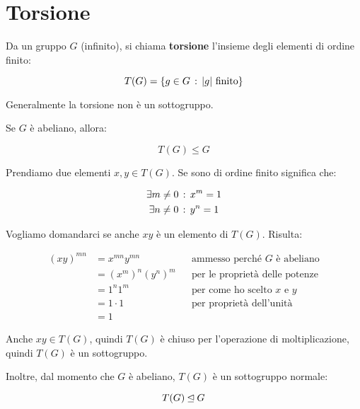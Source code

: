 \chapter{Torsione}

Da un gruppo $G$ (infinito), si chiama \textbf{torsione} l'insieme degli elementi di ordine finito:

\begin{equation}
	T(G) = \{g \in G \,:\, \lvert g \rvert \text{ finito}\}
\end{equation}

Generalmente la torsione non è un sottogruppo.

\begin{esercizio}
	Se $G$ è abeliano, allora:
	
	\begin{equation}
		T(G) \le G
	\end{equation}
\end{esercizio}
\begin{soluzione}
	Prendiamo due elementi $x, y \in T(G)$. Se sono di ordine finito significa che:
	
	\begin{gather}
		\exists m \ne 0 \,:\, x^m = 1 \\
		\exists n \ne 0 \,:\, y^n = 1
	\end{gather}

	Vogliamo domandarci se anche $xy$ è un elemento di $T(G)$. Risulta:
	
	\begin{align}
		(xy)^{mn} &= x^{mn}y^{mn} && \text{ammesso perché $G$ è abeliano} \\
		&= (x^m)^n(y^n)^m && \text{per le proprietà delle potenze} \\
		&= 1^n1^m && \text{per come ho scelto $x$ e $y$} \\
		&= 1 \cdot 1 && \text{per proprietà dell'unità} \\
		&= 1
	\end{align}

	Anche $xy \in T(G)$, quindi $T(G)$ è chiuso per l'operazione di moltiplicazione, quindi $T(G)$ è un sottogruppo.
	
	Inoltre, dal momento che $G$ è abeliano, $T(G)$ è un sottogruppo normale:
	
	\begin{equation}
		T(G) \unlhd G
	\end{equation}
\end{soluzione}

